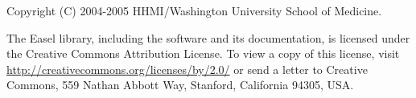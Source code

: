 \vspace*{\fill}
\begin{flushleft}
Copyright (C) 2004-2005 HHMI/Washington University School of Medicine.\vspace{5mm}

The Easel library, including the software and its documentation, is
licensed under the Creative Commons Attribution License.  To view a
copy of this license, visit
\url{http://creativecommons.org/licenses/by/2.0/}
or send a letter to Creative Commons, 559 Nathan Abbott Way, Stanford, California 94305,
USA.

\vspace{5mm}
\end{flushleft}
